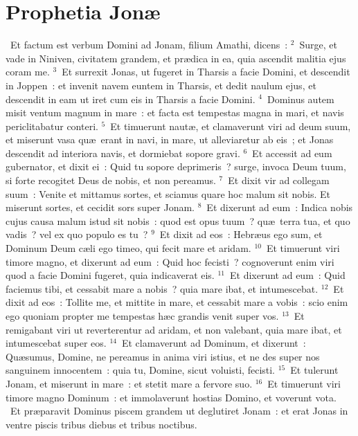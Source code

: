 \clearpage
{\centering \section*{Prophetia Jonæ}}\thispagestyle{empty}

~Et factum est verbum Domini ad Jonam, filium Amathi, dicens~:
${}^{2}$~Surge, et vade in Niniven, civitatem grandem, et pr\ae dica in ea, quia ascendit malitia ejus coram me.
${}^{3}$~Et surrexit Jonas, ut fugeret in Tharsis a facie Domini, et descendit in Joppen~: et invenit navem euntem in Tharsis, et dedit naulum ejus, et descendit in eam ut iret cum eis in Tharsis a facie Domini.
${}^{4}$~Dominus autem misit ventum magnum in mare~: et facta est tempestas magna in mari, et navis periclitabatur conteri.
${}^{5}$~Et timuerunt naut\ae , et clamaverunt viri ad deum suum, et miserunt vasa qu\ae\ erant in navi, in mare, ut alleviaretur ab eis~; et Jonas descendit ad interiora navis, et dormiebat sopore gravi.
${}^{6}$~Et accessit ad eum gubernator, et dixit ei~: Quid tu sopore deprimeris~? surge, invoca Deum tuum, si forte recogitet Deus de nobis, et non pereamus.
${}^{7}$~Et dixit vir ad collegam suum~: Venite et mittamus sortes, et sciamus quare hoc malum sit nobis. Et miserunt sortes, et cecidit sors super Jonam.
${}^{8}$~Et dixerunt ad eum~: Indica nobis cujus causa malum istud sit nobis~: quod est opus tuum~? qu\ae\ terra tua, et quo vadis~? vel ex quo populo es tu~?
${}^{9}$~Et dixit ad eos~: Hebr\ae us ego sum, et Dominum Deum c\ae li ego timeo, qui fecit mare et aridam.
${}^{10}$~Et timuerunt viri timore magno, et dixerunt ad eum~: Quid hoc fecisti~? cognoverunt enim viri quod a facie Domini fugeret, quia indicaverat eis.
${}^{11}$~Et dixerunt ad eum~: Quid faciemus tibi, et cessabit mare a nobis~? quia mare ibat, et intumescebat.
${}^{12}$~Et dixit ad eos~: Tollite me, et mittite in mare, et cessabit mare a vobis~: scio enim ego quoniam propter me tempestas h\ae c grandis venit super vos.
${}^{13}$~Et remigabant viri ut reverterentur ad aridam, et non valebant, quia mare ibat, et intumescebat super eos.
${}^{14}$~Et clamaverunt ad Dominum, et dixerunt~: Qu\ae sumus, Domine, ne pereamus in anima viri istius, et ne des super nos sanguinem innocentem~: quia tu, Domine, sicut voluisti, fecisti.
${}^{15}$~Et tulerunt Jonam, et miserunt in mare~: et stetit mare a fervore suo.
${}^{16}$~Et timuerunt viri timore magno Dominum~: et immolaverunt hostias Domino, et voverunt vota.
~Et pr\ae paravit Dominus piscem grandem ut deglutiret Jonam~: et erat Jonas in ventre piscis tribus diebus et tribus noctibus.
